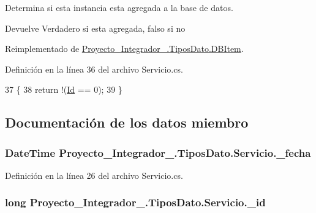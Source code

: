 Determina si esta instancia esta agregada a la base de datos. 

\begin{DoxyReturn}{Devuelve}
Verdadero si esta agregada, falso si no
\end{DoxyReturn}


Reimplementado de \hyperlink{class_proyecto___integrador__3_1_1_tipos_dato_1_1_d_b_item_ab88d7eef0fa58d7d5fdf40039867dd6e}{Proyecto\-\_\-\-Integrador\-\_.\-Tipos\-Dato.\-D\-B\-Item}.



Definición en la línea 36 del archivo Servicio.\-cs.


\begin{DoxyCode}
37         \{
38             \textcolor{keywordflow}{return} !(\hyperlink{class_proyecto___integrador__3_1_1_tipos_dato_1_1_servicio_a81c451c62cc6b77b6f80614df5ffb80d}{Id} == 0);
39         \}
\end{DoxyCode}


\subsection{Documentación de los datos miembro}
\hypertarget{class_proyecto___integrador__3_1_1_tipos_dato_1_1_servicio_af33dd41383dbfde1410187bcb1951b95}{
\subsubsection[{\-\_\-fecha}]{\setlength{\rightskip}{0pt plus 5cm}Date\-Time Proyecto\-\_\-\-Integrador\-\_.\-Tipos\-Dato.\-Servicio.\-\_\-fecha\hspace{0.3cm}{\ttfamily [private]}}}\label{class_proyecto___integrador__3_1_1_tipos_dato_1_1_servicio_af33dd41383dbfde1410187bcb1951b95}


Definición en la línea 26 del archivo Servicio.\-cs.

\hypertarget{class_proyecto___integrador__3_1_1_tipos_dato_1_1_servicio_a127ad69f3c770d82a248b73276e41388}{
\subsubsection[{\-\_\-id}]{\setlength{\rightskip}{0pt plus 5cm}long Proyecto\-\_\-\-Integrador\-\_.\-Tipos\-Dato.\-Servicio.\-\_\-id\hspace{0.3cm}{\ttfamily [private]}}}\label{class_proyecto___integrador__3_1_1_tipos_dato_1_1_servicio_a127ad69f3c770d82a248b73276e41388}


